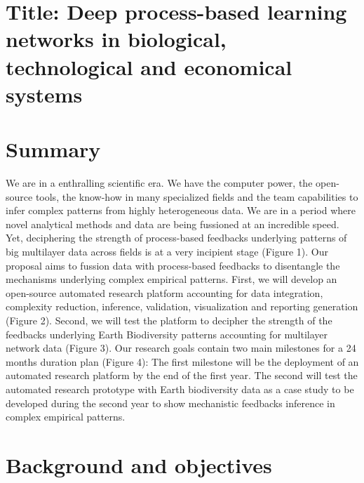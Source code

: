 \documentclass[authoryear,1p,12pt]{elsarticle}
\begin{document}
\section{{\bf Title: Deep process-based learning networks in biological, technological and economical systems}}

\section{{\bf Summary}}
We are in a enthralling scientific era. We have the computer power,
the open-source tools, the know-how in many specialized fields and the
team capabilities to infer complex patterns from highly heterogeneous
data. We are in a period where novel analytical methods and data are
being fussioned at an incredible speed. Yet, deciphering the strength
of process-based feedbacks underlying patterns of big multilayer data
across fields is at a very incipient stage (Figure 1). Our proposal
aims to fussion data with process-based feedbacks to disentangle the
mechanisms underlying complex empirical patterns. First, we will
develop an open-source automated research platform accounting for data
integration, complexity reduction, inference, validation,
visualization and reporting generation (Figure 2). Second, we will
test the platform to decipher the strength of the feedbacks underlying
Earth Biodiversity patterns accounting for multilayer network data
(Figure 3). Our research goals contain two main milestones for a 24
months duration plan (Figure 4): The first milestone will be the
deployment of an automated research platform by the end of the first
year. The second will test the automated research prototype with Earth
biodiversity data as a case study to be developed during the second
year to show mechanistic feedbacks inference in complex empirical
patterns.

\newpage

\section{Background and objectives}
\end{document}

